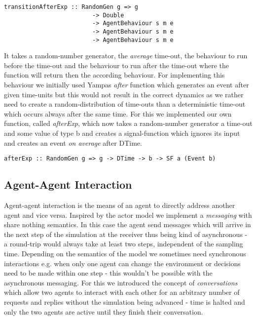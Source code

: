 \begin{verbatim}
transitionAfterExp :: RandomGen g => g
						 -> Double 
						 -> AgentBehaviour s m e 
						 -> AgentBehaviour s m e 
						 -> AgentBehaviour s m e
\end{verbatim}

It takes a random-number generator, the \textit{average} time-out, the behaviour to run before the time-out and the behaviour to run after the time-out where the function will return then the according behaviour. For implementing this behaviour we initially used Yampas \textit{after} function which generates an event after given time-units but this would not result in the correct dynamics as we rather need to create a random-distribution of time-outs than a deterministic time-out which occurs always after the same time. For this we implemented our own function, called \textit{afterExp}, which now takes a random-number generator a time-out and some value of type b and creates a signal-function which ignores its input and creates an event \textit{on average} after DTime.

\begin{verbatim}
afterExp :: RandomGen g => g -> DTime -> b -> SF a (Event b)
\end{verbatim}

\subsection{Agent-Agent Interaction}
Agent-agent interaction is the means of an agent to directly address another agent and vice versa. Inspired by the actor model we implement a  \textit{messaging} with share nothing semantics. In this case the agent send messages which will arrive in the next step of the simulation at the receiver thus being kind of asynchronous - a round-trip would always take at least two steps, independent of the sampling time. Depending on the semantics of the model we sometimes need synchronous interactions e.g. when only one agent can change the environment or decisions need to be made within one step - this wouldn't be possible with the asynchronous messaging. For this we introduced the concept of \textit{conversations} which allow two agents to interact with each other for an arbitrary number of requests and replies without the simulation being advanced - time is halted and only the two agents are active until they finish their conversation.

